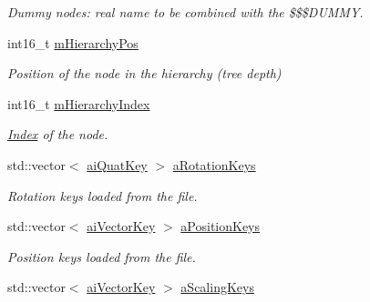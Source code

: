 \begin{DoxyCompactItemize}
\begin{DoxyCompactList}\small\item\em Dummy nodes\+: real name to be combined with the \$\$\$\+D\+U\+M\+M\+Y. \end{DoxyCompactList}\item 
\hypertarget{struct_assimp_1_1_d3_d_s_1_1_node_af086b70604ca99554521b0cfedc88698}{int16\+\_\+t \hyperlink{struct_assimp_1_1_d3_d_s_1_1_node_af086b70604ca99554521b0cfedc88698}{m\+Hierarchy\+Pos}}\label{struct_assimp_1_1_d3_d_s_1_1_node_af086b70604ca99554521b0cfedc88698}

\begin{DoxyCompactList}\small\item\em Position of the node in the hierarchy (tree depth) \end{DoxyCompactList}\item 
\hypertarget{struct_assimp_1_1_d3_d_s_1_1_node_a481fa66fa65352b20dac5f7b3b308036}{int16\+\_\+t \hyperlink{struct_assimp_1_1_d3_d_s_1_1_node_a481fa66fa65352b20dac5f7b3b308036}{m\+Hierarchy\+Index}}\label{struct_assimp_1_1_d3_d_s_1_1_node_a481fa66fa65352b20dac5f7b3b308036}

\begin{DoxyCompactList}\small\item\em \hyperlink{struct_index}{Index} of the node. \end{DoxyCompactList}\item 
\hypertarget{struct_assimp_1_1_d3_d_s_1_1_node_a01b4c52945d4e34caceeca4065ea2f32}{std\+::vector$<$ \hyperlink{structai_quat_key}{ai\+Quat\+Key} $>$ \hyperlink{struct_assimp_1_1_d3_d_s_1_1_node_a01b4c52945d4e34caceeca4065ea2f32}{a\+Rotation\+Keys}}\label{struct_assimp_1_1_d3_d_s_1_1_node_a01b4c52945d4e34caceeca4065ea2f32}

\begin{DoxyCompactList}\small\item\em Rotation keys loaded from the file. \end{DoxyCompactList}\item 
\hypertarget{struct_assimp_1_1_d3_d_s_1_1_node_a09a0ca94031c510b7e4b31cf87de7911}{std\+::vector$<$ \hyperlink{structai_vector_key}{ai\+Vector\+Key} $>$ \hyperlink{struct_assimp_1_1_d3_d_s_1_1_node_a09a0ca94031c510b7e4b31cf87de7911}{a\+Position\+Keys}}\label{struct_assimp_1_1_d3_d_s_1_1_node_a09a0ca94031c510b7e4b31cf87de7911}

\begin{DoxyCompactList}\small\item\em Position keys loaded from the file. \end{DoxyCompactList}\item 
\hypertarget{struct_assimp_1_1_d3_d_s_1_1_node_a6f50048a128a1005d9e7efdaa24d881e}{std\+::vector$<$ \hyperlink{structai_vector_key}{ai\+Vector\+Key} $>$ \hyperlink{struct_assimp_1_1_d3_d_s_1_1_node_a6f50048a128a1005d9e7efdaa24d881e}{a\+Scaling\+Keys}}\label{struct_assimp_1_1_d3_d_s_1_1_node_a6f50048a128a1005d9e7efdaa24d881e}


\end{DoxyCompactItemize}
